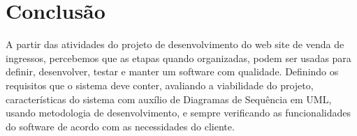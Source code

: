 \documentclass[12pt]{article}
\begin{document}
\section{Conclusão}
A partir das atividades do projeto de desenvolvimento do web site de venda de ingressos, percebemos que as etapas quando organizadas, podem ser usadas para definir, desenvolver, testar e manter um software com qualidade. Definindo os requisitos que o sistema deve conter, avaliando a viabilidade do projeto, características do sistema com auxílio de Diagramas de Sequência em UML, usando metodologia de desenvolvimento, e sempre verificando as funcionalidades do software de acordo com as necessidades do cliente.

\nocite{*}


\end{document}

